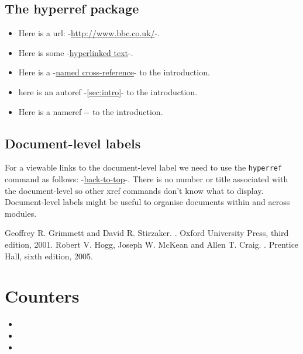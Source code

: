 \documentclass[12pt]{article}
\theoremstyle{plain}
\theoremstyle{definition}
\theoremstyle{remark}
\theoremstyle{mystyle}
\begin{document}
\subsection{The hyperref package}
\begin{itemize}
\item Here is a url: -\url{http://www.bbc.co.uk/}-.
\item Here is some -\href{http://www.bbc.co.uk/}{hyperlinked text}-.
\item Here is a -\hyperref[sec:intro]{named cross-reference}- to the introduction.
\item here is an autoref -\autoref{sec:intro}- to the introduction.
\item Here is a nameref -- to the introduction.
\end{itemize}

\subsection*{Document-level labels}
For a viewable links to the document-level label we need to use the \texttt{hyperref} command as follows: -\hyperref[doc:testdoc]{back-to-top}-. There is no number or title associated with the document-level so other xref commands don't know what to display. Document-level labels might be useful to organise documents within and across modules.

\begin{thebibliography}{1}
Geoffrey R. Grimmett and David R. Stirzaker.
.
\newblock Oxford University Press, third edition, 2001.
Robert V. Hogg, Joseph W. McKean and Allen T. Craig.
.
\newblock Prentice Hall, sixth edition, 2005.
\end{thebibliography}



\section{Counters}
\begin{itemize}
\item {}
\item {}
\item {}
\end{itemize}
\end{document}
